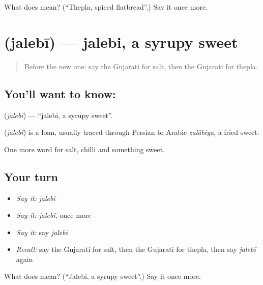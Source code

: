 \begin{tcolorbox}[breakable,colback=teal!4,colframe=teal!35!black,title={Before you move on}]
What does  mean? (\textquotedblleft{}Thepla, spiced flatbread\textquotedblright{}.) Say it once more.
\end{tcolorbox}
\section[\texorpdfstring{\gu{જલેબી} (jalebī)}{જલેબી (jalebī)}]{ (jalebī) — jalebi, a syrupy sweet}

\label{lesson:GU-C60-jalebi}



\begin{quote}
Before the new one: say the Gujarati for salt, then the Gujarati for thepla.
\end{quote}

\subsection*{You'll want to know: }
\textbf{} (\emph{jalebī}) — \textquotedblleft{}jalebi, a syrupy sweet\textquotedblright{}.

\begin{cousinweb}
\textbf{} (\emph{jalebī}) is a loan, usually traced through Persian to Arabic \emph{zalābiya}, a fried sweet.
\end{cousinweb}

\begin{grammarlens}[title={What you've built}]
One more word for salt, chilli and something sweet.
\end{grammarlens}

\subsection*{Your turn}
\begin{itemize}
\raggedright
  \item \emph{Say it:} \emph{jalebī}
  \item \emph{Say it:} \emph{jalebī}, once more
  \item \emph{Say it:} say \emph{jalebī}
  \item \emph{Recall:} say the Gujarati for salt, then the Gujarati for thepla, then say \emph{jalebī} again
\end{itemize}

\begin{tcolorbox}[breakable,colback=teal!4,colframe=teal!35!black,title={Before you move on}]
What does  mean? (\textquotedblleft{}Jalebi, a syrupy sweet\textquotedblright{}.) Say it once more.
\end{tcolorbox}
